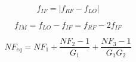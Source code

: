 \begin{equation}
	f_{IF}=|f_{RF}-f_{LO}|
\end{equation}

\begin{equation}
		f_{IM}=f_{LO}-f_{IF}= f_{RF}-2f_{IF}
\end{equation}

\begin{equation}
	NF_{eq}= NF_1 + \frac{NF_2-1}{G_1} + \frac{NF_3-1}{G_1G_2} 
\end{equation}
